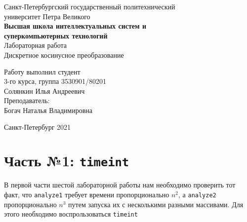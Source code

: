 \documentclass[a4paper]{article}
\begin{document}
    \begin{center}
        \begin{center}
        \hfill \break
        \normalsize{Санкт-Петербургский государственный политехнический}\\
        \normalsize{университет Петра Великого}\\
        \hfill \break
        \normalsize{\textbf{Высшая школа интеллектуальных систем и}}\\ 
        \normalsize{\textbf{суперкомпьютерных технологий}}\\ 
        \hfill \break
        \hfill \break
        \hfill \break
        \normalsize{Лабораторная работа}\\
        \hfill \break
        \hfill \break
        \normalsize{\LARGE Дискретное косинусное преобразование}\\
        \end{center}
        \hfill \break
        \hfill \break
        \hfill \break
        \hfill \break
        \hfill \break
        \hfill \break
        \hfill \break
        \hfill \break
        \hfill \break
        \hfill \break
        \begin{flushright}
            \normalsize{Работу выполнил студент}\\
            \normalsize{3-го курса, группа 3530901/80201}\\
            \normalsize{Солянкин Илья Андреевич}\\
            \hfill \break
            \normalsize{Преподаватель:}\\
            \normalsize{Богач Наталья Владимировна}\\
        \end{flushright}
        \hfill \break
        \hfill \break
        \hfill \break
        \hfill \break
        \begin{center} Санкт-Петербург 2021 \end{center}
        \thispagestyle{empty}
    \end{center}
    
    \newpage
        \tableofcontents
    
    \newpage
         \listoffigures
    
    \newpage
         \lstlistoflistings   
     
    \newpage
        \section{Часть №1: \texttt{timeint}}
            В первой части шестой лабораторной работы нам необходимо проверить тот факт, что \texttt{analyze1} требует времени пропорционально $n^2$, а \texttt{analyze2} пропорционально $n^3$ путем запуска их с несколькими разными массивами. Для этого необходимо воспрользоваться \texttt{timeint}
            
\end{document}

